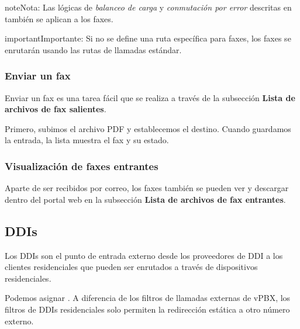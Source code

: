 \documentclass[letterpaper,10pt,spanish]{sphinxmanual}
\begin{document}
\begin{notice}{note}{Nota:}
Las lógicas de \emph{balanceo de carga} y \emph{conmutación por error} descritas en {\hyperref[administration_portal/brand/routing/outgoing_routings:outgoing\string-routings]{}} también se aplican a los faxes.
\end{notice}

\begin{notice}{important}{Importante:}
Si no se define una ruta específica para faxes, los faxes se enrutarán usando las rutas de llamadas estándar.
\end{notice}


\subsubsection{Enviar un fax}
\label{administration_portal/client/residential/faxes:sending-a-fax}
Enviar un fax es una tarea fácil que se realiza a través de la subsección \textbf{Lista de archivos de fax salientes}.

Primero, subimos el archivo PDF y establecemos el destino. Cuando guardamos la entrada, la lista muestra el fax y su estado.


\subsubsection{Visualización de faxes entrantes}
\label{administration_portal/client/residential/faxes:incoming-faxes-display}
Aparte de ser recibidos por correo, los faxes también se pueden ver y descargar dentro del portal web en la subsección \textbf{Lista de archivos de fax entrantes}.


\subsection{DDIs}
\label{administration_portal/client/residential/ddis:ddis}\label{administration_portal/client/residential/ddis:residential-ddis}\label{administration_portal/client/residential/ddis::doc}
Los DDIs son el punto de entrada externo desde los proveedores de DDI a los clientes residenciales que pueden ser enrutados a través de dispositivos residenciales.

Podemos asignar {\hyperref[administration_portal/client/vpbx/routing_tools/external_call_filters:external\string-call\string-filters]{}}. A diferencia de los filtros de llamadas externas de vPBX, los filtros de DDIs residenciales solo permiten la redirección estática a otro número externo.
\end{document}
